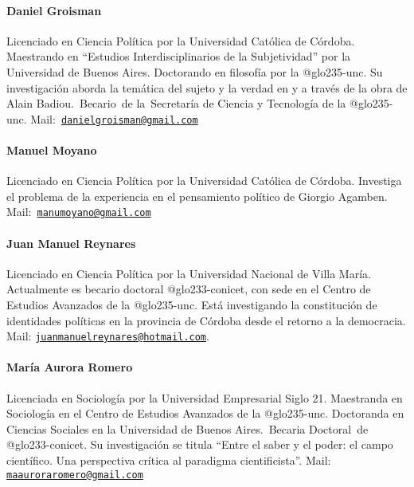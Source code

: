 \paragraph{Daniel Groisman}

Licenciado en Ciencia Política por la Universidad Católica de Córdoba. Maestrando en \enquote{Estudios Interdisciplinarios de la Subjetividad} por la Universidad de Buenos Aires. Doctorando en filosofía por la \gls{@glo235-unc}. Su investigación aborda la temática del sujeto y la verdad en y a través de la obra de Alain Badiou.~Becario~de la~Secretaría de Ciencia y Tecnología de la \gls{@glo235-unc}. Mail:~\href{mailto:danielgroisman@gmail.com}{\nolinkurl{danielgroisman@gmail.com}}

\paragraph{Manuel Moyano}

Licenciado en Ciencia Política por la Universidad Católica de Córdoba. Investiga el problema de la experiencia en el pensamiento político de Giorgio Agamben. Mail:~\href{mailto:manumoyano@gmail.com}{\nolinkurl{manumoyano@gmail.com}}~

\paragraph{Juan Manuel Reynares}

Licenciado en Ciencia Política por la Universidad Nacional de Villa María. Actualmente es becario doctoral \gls{@glo233-conicet}, con sede en el Centro de Estudios Avanzados de la \gls{@glo235-unc}. Está investigando la constitución de identidades políticas en la provincia de Córdoba desde el retorno a la democracia. Mail: \href{mailto:juanmanuelreynares@hotmail.com}{\nolinkurl{juanmanuelreynares@hotmail.com}}.

\paragraph{María Aurora Romero}

Licenciada en Sociología por la Universidad Empresarial Siglo 21. Maestranda en Sociología en el Centro de Estudios Avanzados de la \gls{@glo235-unc}. Doctoranda en Ciencias Sociales en la Universidad de Buenos Aires.~Becaria Doctoral~de \gls{@glo233-conicet}. Su investigación se titula \enquote{Entre el saber y el poder: el campo científico. Una perspectiva crítica al paradigma cientificista}. Mail: \href{mailto:maauroraromero@gmail.com}{\nolinkurl{maauroraromero@gmail.com}}

